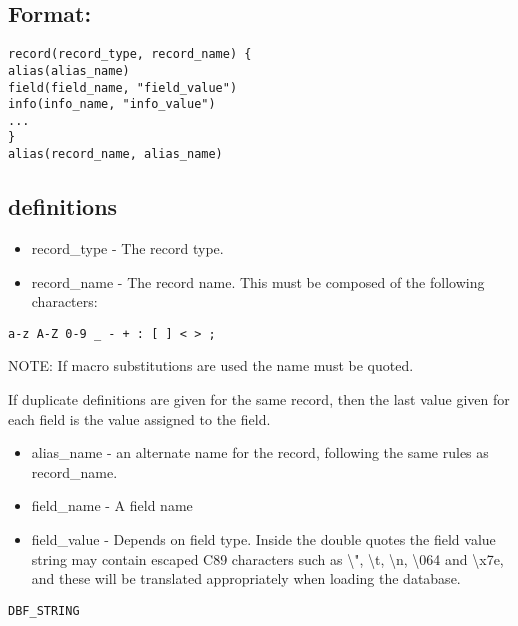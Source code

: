 \subsection{Format:}

\begin{verbatim}record(record_type, record_name) {
alias(alias_name)
field(field_name, "field_value")
info(info_name, "info_value")
...
}
alias(record_name, alias_name)
\end{verbatim}\subsection{definitions}

\begin{itemize}\item {}record\_type - The record type. 

\item {}record\_name - The record name. This must be composed of the following characters:

\end{itemize}\begin{verbatim}a-z A-Z 0-9 _ - + : [ ] < > ;
\end{verbatim}\begin{description}\item NOTE: If macro substitutions are used the name must be quoted.

\item If duplicate definitions are given for the same record, then the last value given for each field is the value assigned 
to the field. 

\end{description}\begin{itemize}\item {}alias\_name - an alternate name for the record, following the same rules as record\_name.

\item {}field\_name - A field name

\item {}field\_value - Depends on field type. Inside the double quotes the field value string may contain escaped C89 
characters such as \textbackslash{}", \textbackslash{}t, \textbackslash{}n, \textbackslash{}064 and \textbackslash{}x7e, and these will be translated appropriately when loading the database.

\end{itemize}\verb|DBF_STRING|

